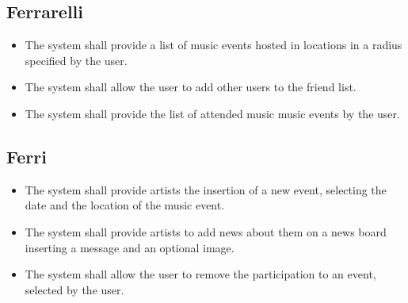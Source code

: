 \documentclass[11pt,a4paper]{article}
\begin{document}
\subsection{Ferrarelli}
\begin{itemize}
\item The system shall provide a list of music events hosted in locations in a radius specified by the user.
\item The system shall allow the user to add other users to the friend list.
\item The system shall provide the list of attended music music events by the user.
\end{itemize}
\subsection{Ferri}
\begin{itemize}
\item The system shall provide artists the insertion of a new event, selecting the date and the location of the music event.
\item The system shall provide artists to add news about them on a news board inserting a message and an optional image.
\item The system shall allow the user to remove the participation to an event, selected by the user.
\end{itemize}
\end{document}
